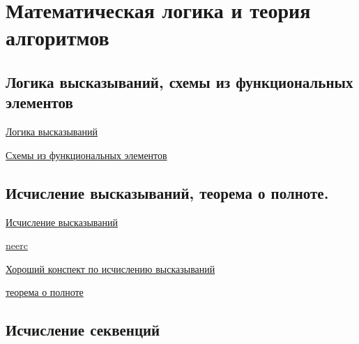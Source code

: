 \documentclass{article}
\begin{document}
\section{Математическая логика и теория алгоритмов}

\subsection{Логика высказываний, схемы из функциональных элементов}

\href{https://ru.wikipedia.org/wiki/%D0%9B%D0%BE%D0%B3%D0%B8%D0%BA%D0%B0_%D0%B2%D1%8B%D1%81%D0%BA%D0%B0%D0%B7%D1%8B%D0%B2%D0%B0%D0%BD%D0%B8%D0%B9}{Логика высказываний}

\href{http://mathhelpplanet.com/static.php?p=skhemy-iz-funktsionalnykh-elementov}{Схемы из функциональных элементов}

\subsection{Исчисление высказываний, теорема о полноте.}

\href{https://lms2.sseu.ru/courses/eresmat/metod/met6/parmet6_8.htm#:~:text=%D0%98%D1%81%D1%87%D0%B8%D1%81%D0%BB%D0%B5%D0%BD%D0%B8%D0%B5%20%D0%B2%D1%8B%D1%81%D0%BA%D0%B0%D0%B7%D1%8B%D0%B2%D0%B0%D0%BD%D0%B8%D0%B9%20%E2%80%93%20%D1%8D%D1%82%D0%BE%20%D0%B0%D0%BA%D1%81%D0%B8%D0%BE%D0%BC%D0%B0%D1%82%D0%B8%D1%87%D0%B5%D1%81%D0%BA%D0%B0%D1%8F%20%D0%BB%D0%BE%D0%B3%D0%B8%D1%87%D0%B5%D1%81%D0%BA%D0%B0%D1%8F,%D1%81%D0%B8%D0%BC%D0%B2%D0%BE%D0%BB%D0%BE%D0%B2%20%D0%B8%20%D0%BE%D0%BF%D1%80%D0%B5%D0%B4%D0%B5%D0%BB%D0%B5%D0%BD%D0%B8%D0%B5%20%D0%B2%D1%8B%D0%B2%D0%BE%D0%B4%D0%B8%D0%BC%D1%8B%D1%85%20%D1%84%D0%BE%D1%80%D0%BC%D1%83%D0%BB.}{Исчисление высказываний}

\href{https://neerc.ifmo.ru/wiki/index.php?title=%D0%98%D1%81%D1%87%D0%B8%D1%81%D0%BB%D0%B5%D0%BD%D0%B8%D0%B5_%D0%B2%D1%8B%D1%81%D0%BA%D0%B0%D0%B7%D1%8B%D0%B2%D0%B0%D0%BD%D0%B8%D0%B9}{neerc}

\href{https://mipt.lectoriy.ru/file/synopsis/pdf/Maths-MathemLogic-M05-Musatov-141001.04.pdf}{Хороший конспект по исчислению высказываний}

\href{https://mipt.lectoriy.ru/file/synopsis/pdf/Maths-MathemLogic-M06-Musatov-141008.03.pdf}{теорема о полноте}


\subsection{Исчисление секвенций}
\end{document}

